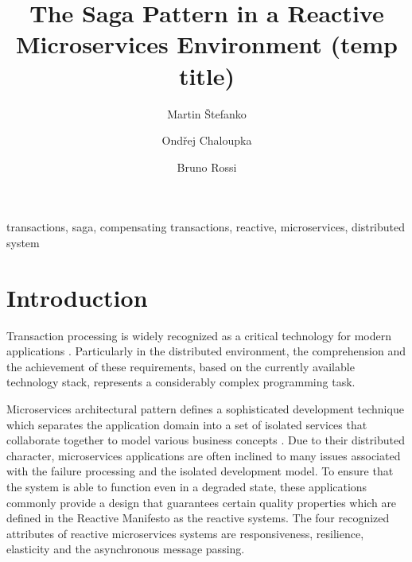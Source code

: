 \documentclass[5p]{elsarticle}
\begin{document}
\begin{frontmatter}

\title{The Saga Pattern in a
Reactive Microservices
Environment (temp title)}

 \author[firstaddress]{Martin Štefanko}

 \author[secondaddress]{Ondřej Chaloupka}
 \author[firstaddress]{Bruno Rossi}

 \address[firstaddress]{Masaryk University, Faculty of Informatics, Brno, Czech Republic}
 
 \address[secondaddress]{Red Hat, Brno, Czech Republic}

\begin{abstract}

\end{abstract}

\begin{keyword}
transactions, saga, compensating transactions, reactive, microservices, distributed system
\end{keyword}

\end{frontmatter}


\section{Introduction}

Transaction processing is widely recognized as a critical technology for modern applications \cite{java_tran_processing}. Particularly in the distributed environment, the comprehension and the achievement of these requirements, based on the currently available technology stack, represents a considerably complex programming task.

Microservices architectural pattern defines a sophisticated development technique which separates the application domain into a set of isolated services that collaborate together to model various business concepts \cite{building_ms}. Due to their distributed character, microservices applications are often inclined to many issues associated with the failure processing and the isolated development model. To ensure that the system is able to function even in a degraded state, these applications commonly provide a design that guarantees certain quality properties which are defined in the Reactive Manifesto \cite{reactive_manifesto} as the reactive systems. The four recognized attributes of reactive microservices systems are responsiveness, resilience, elasticity and the asynchronous message passing.
\end{document}
